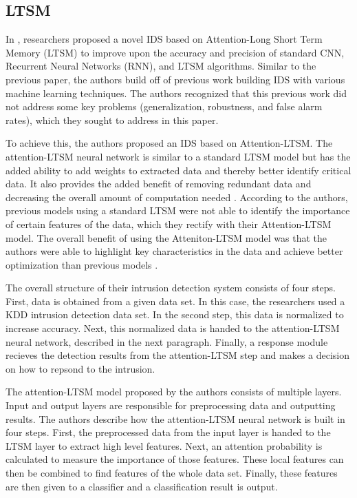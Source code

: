 \subsection{LTSM}

In \cite{yang20}, researchers proposed a novel IDS based on Attention-Long Short Term Memory (LTSM) to improve upon the accuracy and precision of standard CNN, Recurrent Neural Networks (RNN), and LTSM algorithms. Similar to the previous paper, the authors build off of previous work building IDS with various machine learning techniques. The authors recognized that this previous work did not address some key problems (generalization, robustness, and false alarm rates), which they sought to address in this paper. 

To achieve this, the authors proposed an IDS based on Attention-LTSM. The attention-LTSM neural network is similar to a standard LTSM model but has the added ability to add weights to extracted data and thereby better identify critical data. It also provides the added benefit of removing redundant data and decreasing the overall amount of computation needed \cite{yang20}. According to the authors, previous models using a standard LTSM were not able to identify the importance of certain features of the data, which they rectify with their Attention-LTSM model. The overall benefit of using the Atteniton-LTSM model was that the authors were able to highlight key characteristics in the data and achieve better optimization than previous models \cite{yang20}.

The overall structure of their intrusion detection system consists of four steps. First, data is obtained from a given data set. In this case, the researchers used a KDD intrusion detection data set. In the second step, this data is normalized to increase accuracy. Next, this normalized data is handed to the attention-LTSM neural network, described in the next paragraph. Finally, a response module recieves the detection results from the attention-LTSM step and makes a decision on how to repsond to the intrusion. 

The attention-LTSM model proposed by the authors consists of multiple layers. Input and output layers are responsible for preprocessing data and outputting results. The authors describe how the attention-LTSM neural network is built in four steps. First, the preprocessed data from the input layer is handed to the LTSM layer to extract high level features. Next, an attention probability is calculated to measure the importance of those features. These local features can then be combined to find features of the whole data set. Finally, these features are then given to a classifier and a classification result is output. 


